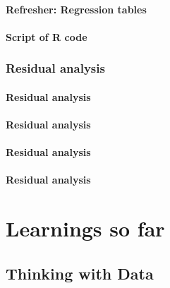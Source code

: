 \documentclass[
  12pt, krantz2,
]{krantz}
\begin{document}
\hypertarget{refresher-regression-tables}{%
\subsection{Refresher: Regression tables}\label{refresher-regression-tables}}

\hypertarget{script-of-r-code}{%
\subsection{Script of R code}\label{script-of-r-code}}

\hypertarget{residual-analysis}{%
\section{Residual analysis}\label{residual-analysis}}

\hypertarget{model1residuals}{%
\subsection{Residual analysis}\label{model1residuals}}

\hypertarget{model2residuals}{%
\subsection{Residual analysis}\label{model2residuals}}

\hypertarget{model3residuals}{%
\subsection{Residual analysis}\label{model3residuals}}

\hypertarget{model4residuals}{%
\subsection{Residual analysis}\label{model4residuals}}

\hypertarget{part-learnings-so-far}{%
\part{Learnings so far}\label{part-learnings-so-far}}

\hypertarget{thinking-with-data}{%
\chapter{Thinking with Data}\label{thinking-with-data}}
\end{document}
